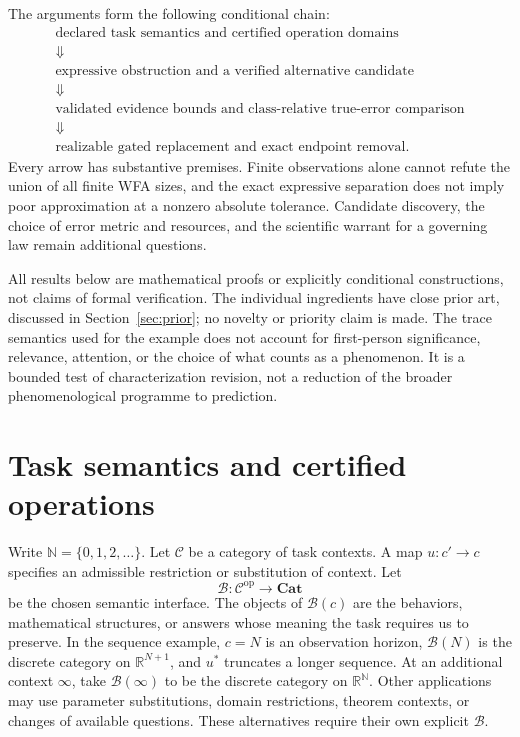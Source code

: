 \documentclass[11pt]{article}
\theoremstyle{definition}
\begin{document}
The arguments form the following conditional chain:
\[
 \begin{gathered}
 \text{declared task semantics and certified operation domains}\\
 \Downarrow\\
 \text{expressive obstruction and a verified alternative candidate}\\
 \Downarrow\\
 \text{validated evidence bounds and class-relative true-error comparison}\\
 \Downarrow\\
 \text{realizable gated replacement and exact endpoint removal}.
 \end{gathered}
\]
Every arrow has substantive premises. Finite observations alone cannot
refute the union of all finite WFA sizes, and the exact expressive separation
does not imply poor approximation at a nonzero absolute tolerance.
Candidate discovery, the choice of error metric and resources, and the
scientific warrant for a governing law remain additional questions.

All results below are mathematical proofs or explicitly conditional
constructions, not claims of formal verification. The individual ingredients have close prior art, discussed in
Section~\ref{sec:prior}; no novelty or priority claim is made. The trace
semantics used for the example does not account for first-person significance,
relevance, attention, or the choice of what counts as a phenomenon. It is a
bounded test of characterization revision, not a reduction of the broader
phenomenological programme to prediction.

\section{Task semantics and certified operations}
\label{sec:semantics}

Write $\mathbb N=\{0,1,2,\ldots\}$. Let $\mathcal C$ be a category of task contexts. A map $u:c'\to c$ specifies an
admissible restriction or substitution of context. Let
\[
  \mathcal B:\mathcal C^{\mathrm{op}}\longrightarrow\mathbf{Cat}
\]
be the chosen semantic interface. The objects of $\mathcal B(c)$ are the
behaviors, mathematical structures, or answers whose meaning the task requires
us to preserve. In the sequence example, $c=N$ is an observation horizon,
$\mathcal B(N)$ is the discrete category on $\mathbb R^{N+1}$, and
$u^*$ truncates a longer sequence. At an additional context $\infty$,
take $\mathcal B(\infty)$ to be the discrete category on $\mathbb R^{\mathbb N}$.
Other applications may use parameter
substitutions, domain restrictions, theorem contexts, or changes of available
questions. These alternatives require their own explicit $\mathcal B$.
\end{document}
